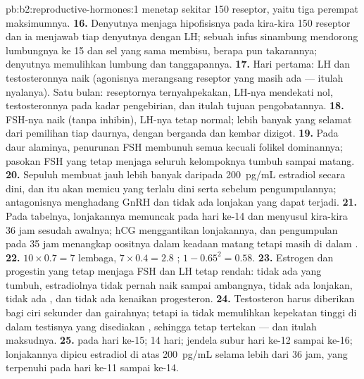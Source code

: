 \begin{solution}{pb:b2:reproductive-hormones:1}
menetap sekitar 150 reseptor, yaitu tiga perempat maksimumnya.
\textbf{16.} Denyutnya menjaga hipofisisnya pada kira-kira 150 reseptor
dan ia menjawab tiap denyutnya dengan LH; sebuah infus sinambung
mendorong lumbungnya ke 15 dan sel yang sama membisu, berapa pun
takarannya; denyutnya memulihkan lumbung dan tanggapannya.
\textbf{17.} Hari pertama: LH dan testosteronnya naik (agonisnya
merangsang reseptor yang masih ada --- itulah nyalanya). Satu bulan:
reseptornya ternyahpekakan, LH-nya mendekati nol, testosteronnya pada
kadar pengebirian, dan itulah tujuan pengobatannya.
\textbf{18.} FSH-nya naik (tanpa inhibin), LH-nya tetap normal; lebih
banyak  yang selamat dari pemilihan tiap daurnya, dengan 
berganda dan kembar dizigot.
\textbf{19.} Pada daur alaminya, penurunan FSH membunuh semua kecuali
folikel dominannya; pasokan FSH yang tetap menjaga seluruh kelompoknya
tumbuh sampai matang.
\textbf{20.} Sepuluh  membuat jauh lebih banyak daripada
\qty{200}{pg/mL} estradiol secara dini, dan itu akan memicu 
yang terlalu dini serta  sebelum pengumpulannya; antagonisnya
menghadang GnRH dan tidak ada lonjakan yang dapat terjadi.
\textbf{21.} Pada tabelnya, lonjakannya memuncak pada hari ke-14 dan
 menyusul kira-kira 36 jam sesudah awalnya; hCG menggantikan
lonjakannya, dan pengumpulan pada 35 jam menangkap oositnya dalam
keadaan matang tetapi masih di dalam .
\textbf{22.} $10\times 0.7 = 7$ lembaga, $7\times 0.4 = 2.8$
; $1 - 0.65^{2} = 0.58$.
\textbf{23.} Estrogen dan progestin yang tetap menjaga FSH dan LH tetap
rendah: tidak ada  yang tumbuh, estradiolnya tidak pernah naik
sampai ambangnya, tidak ada lonjakan, tidak ada , dan
tidak ada kenaikan progesteron.
\textbf{24.} Testosteron harus diberikan bagi ciri sekunder dan
gairahnya; tetapi ia tidak memulihkan kepekatan tinggi di dalam
testisnya yang disediakan , sehingga  tetap
tertekan --- dan itulah maksudnya.
\textbf{25.}  pada hari ke-15;  14 hari; jendela
subur hari ke-12 sampai ke-16; lonjakannya dipicu estradiol di atas
\qty{200}{pg/mL} selama lebih dari 36 jam, yang terpenuhi pada hari
ke-11 sampai ke-14.
\end{solution}
